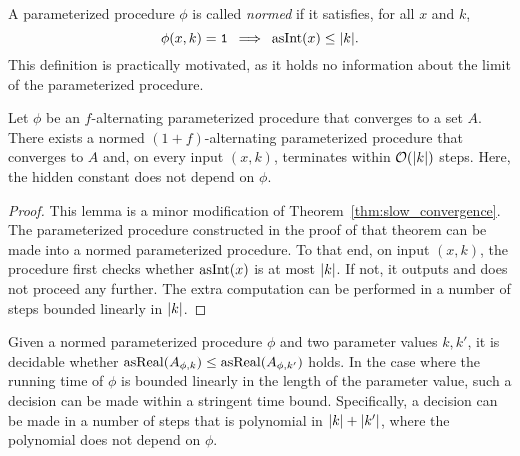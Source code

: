 A parameterized procedure $\phi$ is called \emph{normed} \parencite{ambos-spies2000weakly} if it satisfies, for all $x$ and $k$,
\begin{equation*}
  \phi(x, k) = \textnormal{\texttt{1}} \:\implies\: \operatorname{asInt}(x) \le {\lvert k\rvert}.
\end{equation*}
This definition is practically motivated, as it holds no information about the limit of the parameterized procedure.
\begin{lemma}
\label{lem:slow_convergence_normed}
  Let $\phi$ be an $f$-alternating parameterized procedure that converges to a set $A$.
  There exists a normed $(1 + f)$-alternating parameterized procedure that converges to $A$ and, on every input $(x, k)$, terminates within $\operatorname{\mathcal{O}}({\lvert k\rvert})$ steps.
  Here, the hidden constant does not depend on $\phi$.
\end{lemma}
\begin{proof}
  This lemma is a minor modification of Theorem~\ref{thm:slow_convergence}.
  The parameterized procedure constructed in the proof of that theorem can be made into a normed parameterized procedure.
  To that end, on input $(x, k)$, the procedure first checks whether $\operatorname{asInt}(x)$ is at most ${\lvert k\rvert}$.
  If not, it outputs  and does not proceed any further.
  The extra computation can be performed in a number of steps bounded linearly in ${\lvert k\rvert}$.
\end{proof}

Given a normed parameterized procedure $\phi$ and two parameter values $k, k'$, it is decidable whether $\operatorname{asReal}(A_{\phi, k}) \le \operatorname{asReal}(A_{\phi, k'})$ holds.
In the case where the running time of $\phi$ is bounded linearly in the length of the parameter value, such a decision can be made within a stringent time bound.
Specifically, a decision can be made in a number of steps that is polynomial in ${\lvert k\rvert} + {\lvert k'\rvert}$, where the polynomial does not depend on $\phi$.

